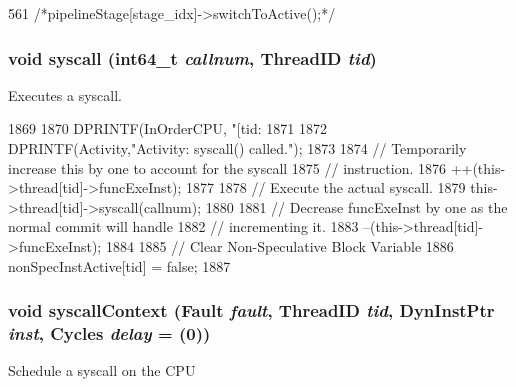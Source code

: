 \begin{DoxyCode}
561     { /*pipelineStage[stage_idx]->switchToActive();*/ }
\end{DoxyCode}
\hypertarget{classInOrderCPU_a2d6a2bbae85e604392f43b3418cdec97}{
\subsubsection[{syscall}]{\setlength{\rightskip}{0pt plus 5cm}void syscall (int64\_\-t {\em callnum}, \/  {\bf ThreadID} {\em tid})}}
\label{classInOrderCPU_a2d6a2bbae85e604392f43b3418cdec97}
Executes a syscall. 


\begin{DoxyCode}
1869 {
1870     DPRINTF(InOrderCPU, "[tid:%
1871 
1872     DPRINTF(Activity,"Activity: syscall() called.\n");
1873 
1874     // Temporarily increase this by one to account for the syscall
1875     // instruction.
1876     ++(this->thread[tid]->funcExeInst);
1877 
1878     // Execute the actual syscall.
1879     this->thread[tid]->syscall(callnum);
1880 
1881     // Decrease funcExeInst by one as the normal commit will handle
1882     // incrementing it.
1883     --(this->thread[tid]->funcExeInst);
1884 
1885     // Clear Non-Speculative Block Variable
1886     nonSpecInstActive[tid] = false;
1887 }
\end{DoxyCode}
\hypertarget{classInOrderCPU_a37f2ec6a00b1cd18aaf408f5a2d3a9f7}{
\subsubsection[{syscallContext}]{\setlength{\rightskip}{0pt plus 5cm}void syscallContext ({\bf Fault} {\em fault}, \/  {\bf ThreadID} {\em tid}, \/  {\bf DynInstPtr} {\em inst}, \/  {\bf Cycles} {\em delay} = {(0)})}}
\label{classInOrderCPU_a37f2ec6a00b1cd18aaf408f5a2d3a9f7}
Schedule a syscall on the CPU 


